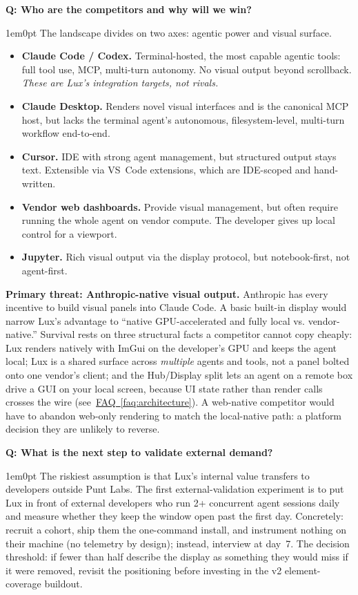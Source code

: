 \documentclass[11pt,letterpaper]{article}
\newcounter{faqnum}
\newenvironment{faqpair}[1]{%
  \needspace{4\baselineskip}%
  \vspace{0.5em}%
  \refstepcounter{faqnum}%
  \noindent\textbf{\color{SectionBlue}Q\thefaqnum: #1}\par\nopagebreak[4]%
  \vspace{0.2em}%
  \begin{adjustwidth}{1em}{0pt}%
  \setlength{\parindent}{0pt}%
}{%
  \end{adjustwidth}%
  \vspace{0.5em}%
}
\newcommand{\faqref}[1]{\hyperref[#1]{FAQ~\ref*{#1}}}
\begin{document}
\begin{faqpair}{Who are the competitors and why will we win?}\label{faq:competitors}
  The landscape divides on two axes: agentic power and visual surface.

  \begin{itemize}[nosep]
    \item \textbf{Claude Code / Codex.} Terminal-hosted, the most capable
      agentic tools: full tool use, MCP, multi-turn autonomy. No visual output
      beyond scrollback. \emph{These are Lux's integration targets, not rivals.}
    \item \textbf{Claude Desktop.} Renders novel visual interfaces and is the
      canonical MCP host, but lacks the terminal agent's autonomous,
      filesystem-level, multi-turn workflow end-to-end.
    \item \textbf{Cursor.} IDE with strong agent management, but structured
      output stays text. Extensible via VS~Code extensions, which are IDE-scoped
      and hand-written.
    \item \textbf{Vendor web dashboards.} Provide visual management, but often
      require running the whole agent on vendor compute. The developer gives up
      local control for a viewport.
    \item \textbf{Jupyter.} Rich visual output via the display protocol, but
      notebook-first, not agent-first.
  \end{itemize}

  \textbf{Primary threat: Anthropic-native visual output.} Anthropic has every
  incentive to build visual panels into Claude Code. A basic built-in display
  would narrow Lux's advantage to ``native GPU-accelerated and fully local vs.
  vendor-native.'' Survival rests on three structural facts a competitor cannot
  copy cheaply: Lux renders natively with ImGui on the developer's GPU and keeps
  the agent local; Lux is a shared surface across \emph{multiple} agents and
  tools, not a panel bolted onto one vendor's client; and the Hub/Display split
  lets an agent on a remote box drive a GUI on your local screen, because UI
  state rather than render calls crosses the wire (see~\faqref{faq:architecture}).
  A web-native competitor would have to abandon web-only rendering to match the
  local-native path: a platform decision they are unlikely to reverse.
\end{faqpair}

\begin{faqpair}{What is the next step to validate external demand?}\label{faq:next-step}
  The riskiest assumption is that Lux's internal value transfers to developers
  outside Punt Labs. The first external-validation experiment is to put Lux in
  front of external developers who run 2+ concurrent agent sessions daily and
  measure whether they keep the window open past the first day. Concretely:
  recruit a cohort, ship them the one-command install, and instrument
  nothing on their machine (no telemetry by design); instead, interview at
  day~7. The
  decision threshold: if fewer than half describe the display as something they
  would miss if it were removed, revisit the positioning before investing in the
  v2 element-coverage buildout.
\end{faqpair}
\end{document}
